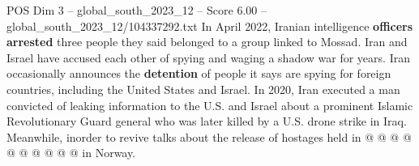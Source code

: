 \begin{textsample}{POS Dim 3 – global\_south\_2023\_12 – Score 6.00 – global\_south\_2023\_12/104337292.txt}
In April 2022, Iranian intelligence \textbf{officers} \textbf{arrested} three people they said belonged to a group linked to Mossad.
Iran and Israel have accused each other of spying and waging a shadow war for years.
Iran occasionally announces the \textbf{detention} of people it says are spying for foreign countries, including the United States and Israel.
In 2020, Iran executed a man convicted of leaking information to the U.S. and Israel about a prominent Islamic Revolutionary Guard general who was later killed by a U.S. drone strike in Iraq.
Meanwhile, inorder to revive talks about the release of hostages held in @ @ @ @ @ @ @ @ @ @ in Norway.

\end{textsample}
